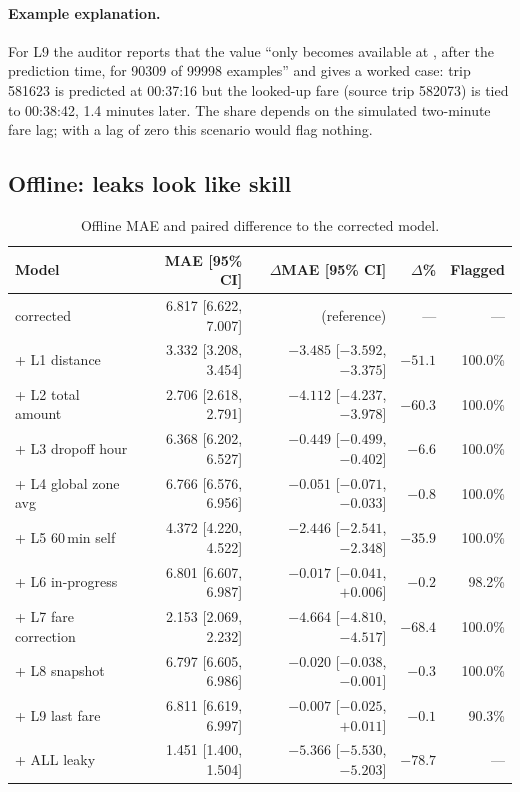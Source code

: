 \documentclass[11pt,a4paper]{article}
\newcommand{\ft}[1]{\texttt{\detokenize{#1}}}
\begin{document}
\paragraph{Example explanation.} For L9 the auditor reports that the value ``only becomes available at \ft{avail_fare}, after the prediction time, for 90309 of 99998 examples'' and gives a worked case: trip 581623 is predicted at 00:37:16 but the looked-up fare (source trip 582073) is tied to 00:38:42, 1.4 minutes later. The share depends on the simulated two-minute fare lag; with a lag of zero this scenario would flag nothing.

\subsection{Offline: leaks look like skill}
\begin{table}[H]
\centering\small
\caption{Offline MAE and paired difference to the corrected model.}
\label{tab:offline}
\begin{tabular}{@{}l r r r r@{}}
\toprule
Model & MAE [95\% CI] & $\Delta$MAE [95\% CI] & $\Delta$\% & Flagged \\
\midrule
corrected & 6.817 [6.622, 7.007] & (reference) & --- & --- \\
+ L1 distance & 3.332 [3.208, 3.454] & $-3.485$ [$-3.592$, $-3.375$] & $-51.1$ & 100.0\% \\
+ L2 total amount & 2.706 [2.618, 2.791] & $-4.112$ [$-4.237$, $-3.978$] & $-60.3$ & 100.0\% \\
+ L3 dropoff hour & 6.368 [6.202, 6.527] & $-0.449$ [$-0.499$, $-0.402$] & $-6.6$ & 100.0\% \\
+ L4 global zone avg & 6.766 [6.576, 6.956] & $-0.051$ [$-0.071$, $-0.033$] & $-0.8$ & 100.0\% \\
+ L5 60\,min self & 4.372 [4.220, 4.522] & $-2.446$ [$-2.541$, $-2.348$] & $-35.9$ & 100.0\% \\
+ L6 in-progress & 6.801 [6.607, 6.987] & $-0.017$ [$-0.041$, $+0.006$] & $-0.2$ & 98.2\% \\
+ L7 fare correction & 2.153 [2.069, 2.232] & $-4.664$ [$-4.810$, $-4.517$] & $-68.4$ & 100.0\% \\
+ L8 snapshot & 6.797 [6.605, 6.986] & $-0.020$ [$-0.038$, $-0.001$] & $-0.3$ & 100.0\% \\
+ L9 last fare & 6.811 [6.619, 6.997] & $-0.007$ [$-0.025$, $+0.011$] & $-0.1$ & 90.3\% \\
+ ALL leaky & 1.451 [1.400, 1.504] & $-5.366$ [$-5.530$, $-5.203$] & $-78.7$ & --- \\
\bottomrule
\end{tabular}
\end{table}
\end{document}
